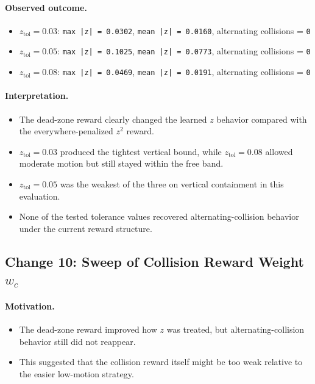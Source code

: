 \documentclass[11pt]{article}
\begin{document}
\paragraph{Observed outcome.}
\begin{itemize}[leftmargin=1.5em]
  \item $z_{\mathrm{tol}} = 0.03$: \texttt{max |z| = 0.0302}, \texttt{mean |z| = 0.0160}, alternating collisions = \texttt{0}
  \item $z_{\mathrm{tol}} = 0.05$: \texttt{max |z| = 0.1025}, \texttt{mean |z| = 0.0773}, alternating collisions = \texttt{0}
  \item $z_{\mathrm{tol}} = 0.08$: \texttt{max |z| = 0.0469}, \texttt{mean |z| = 0.0191}, alternating collisions = \texttt{0}
\end{itemize}

\paragraph{Interpretation.}
\begin{itemize}[leftmargin=1.5em]
  \item The dead-zone reward clearly changed the learned $z$ behavior compared with the everywhere-penalized $z^2$ reward.
  \item $z_{\mathrm{tol}} = 0.03$ produced the tightest vertical bound, while $z_{\mathrm{tol}} = 0.08$ allowed moderate motion but still stayed within the free band.
  \item $z_{\mathrm{tol}} = 0.05$ was the weakest of the three on vertical containment in this evaluation.
  \item None of the tested tolerance values recovered alternating-collision behavior under the current reward structure.
\end{itemize}

\subsection*{Change 10: Sweep of Collision Reward Weight $w_c$}

\paragraph{Motivation.}
\begin{itemize}[leftmargin=1.5em]
  \item The dead-zone reward improved how $z$ was treated, but alternating-collision behavior still did not reappear.
  \item This suggested that the collision reward itself might be too weak relative to the easier low-motion strategy.
\end{itemize}
\end{document}
